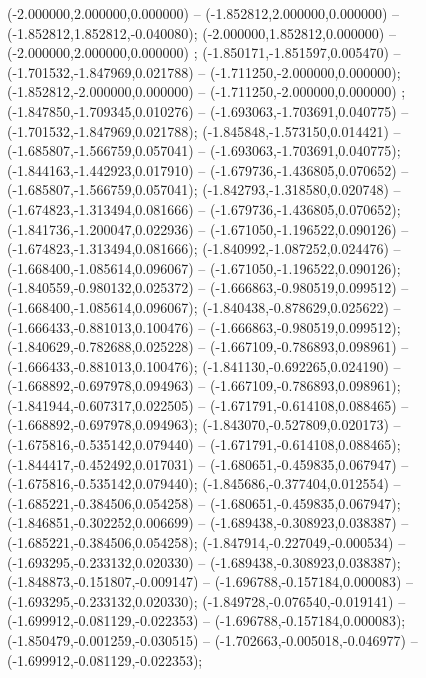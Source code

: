  (-2.000000,2.000000,0.000000) -- (-1.852812,2.000000,0.000000) -- (-1.852812,1.852812,-0.040080);
 (-2.000000,1.852812,0.000000) -- (-2.000000,2.000000,0.000000) ;
 (-1.850171,-1.851597,0.005470) -- (-1.701532,-1.847969,0.021788) -- (-1.711250,-2.000000,0.000000);
 (-1.852812,-2.000000,0.000000) -- (-1.711250,-2.000000,0.000000) ;
 (-1.847850,-1.709345,0.010276) -- (-1.693063,-1.703691,0.040775) -- (-1.701532,-1.847969,0.021788);
 (-1.845848,-1.573150,0.014421) -- (-1.685807,-1.566759,0.057041) -- (-1.693063,-1.703691,0.040775);
 (-1.844163,-1.442923,0.017910) -- (-1.679736,-1.436805,0.070652) -- (-1.685807,-1.566759,0.057041);
 (-1.842793,-1.318580,0.020748) -- (-1.674823,-1.313494,0.081666) -- (-1.679736,-1.436805,0.070652);
 (-1.841736,-1.200047,0.022936) -- (-1.671050,-1.196522,0.090126) -- (-1.674823,-1.313494,0.081666);
 (-1.840992,-1.087252,0.024476) -- (-1.668400,-1.085614,0.096067) -- (-1.671050,-1.196522,0.090126);
 (-1.840559,-0.980132,0.025372) -- (-1.666863,-0.980519,0.099512) -- (-1.668400,-1.085614,0.096067);
 (-1.840438,-0.878629,0.025622) -- (-1.666433,-0.881013,0.100476) -- (-1.666863,-0.980519,0.099512);
 (-1.840629,-0.782688,0.025228) -- (-1.667109,-0.786893,0.098961) -- (-1.666433,-0.881013,0.100476);
 (-1.841130,-0.692265,0.024190) -- (-1.668892,-0.697978,0.094963) -- (-1.667109,-0.786893,0.098961);
 (-1.841944,-0.607317,0.022505) -- (-1.671791,-0.614108,0.088465) -- (-1.668892,-0.697978,0.094963);
 (-1.843070,-0.527809,0.020173) -- (-1.675816,-0.535142,0.079440) -- (-1.671791,-0.614108,0.088465);
 (-1.844417,-0.452492,0.017031) -- (-1.680651,-0.459835,0.067947) -- (-1.675816,-0.535142,0.079440);
 (-1.845686,-0.377404,0.012554) -- (-1.685221,-0.384506,0.054258) -- (-1.680651,-0.459835,0.067947);
 (-1.846851,-0.302252,0.006699) -- (-1.689438,-0.308923,0.038387) -- (-1.685221,-0.384506,0.054258);
 (-1.847914,-0.227049,-0.000534) -- (-1.693295,-0.233132,0.020330) -- (-1.689438,-0.308923,0.038387);
 (-1.848873,-0.151807,-0.009147) -- (-1.696788,-0.157184,0.000083) -- (-1.693295,-0.233132,0.020330);
 (-1.849728,-0.076540,-0.019141) -- (-1.699912,-0.081129,-0.022353) -- (-1.696788,-0.157184,0.000083);
 (-1.850479,-0.001259,-0.030515) -- (-1.702663,-0.005018,-0.046977) -- (-1.699912,-0.081129,-0.022353);
